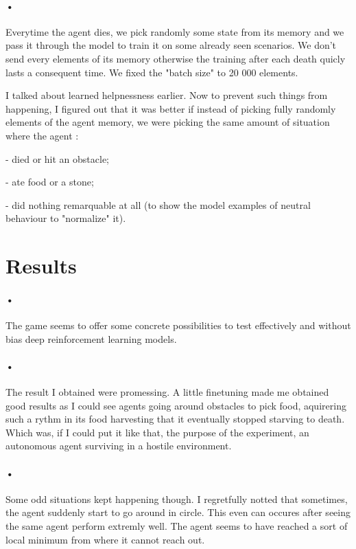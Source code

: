 \documentclass{article}
\begin{document}
\paragraph{•}
Everytime the agent dies, we pick randomly some state from its memory and we pass it through the model to train it on some already seen scenarios. We don't send every elements of its memory otherwise the training after each death quicly lasts a consequent time. We fixed the "batch size" to 20 000 elements.\par
I talked about learned helpnessness\cite{wiki:learned_helplessness} earlier. Now to prevent such things from happening, I figured out that it was better if instead of picking fully randomly elements of the agent memory, we were picking the same amount of situation where the agent :\par
- died or hit an obstacle;\par
- ate food or a stone;\par
- did nothing remarquable at all (to show the model examples of neutral behaviour to "normalize" it).\par

\section{Results}

\paragraph{•}
The game seems to offer some concrete possibilities to test effectively and without bias deep reinforcement learning models.

\paragraph{•}
The result I obtained were promessing. A little finetuning made me obtained good results as I could see agents going around obstacles to pick food, aquirering such a rythm in its food harvesting that it eventually stopped starving to death. Which was, if I could put it like that, the purpose of the experiment, an autonomous agent surviving in a hostile environment.

\paragraph{•}
Some odd situations kept happening though. I regretfully notted that sometimes, the agent suddenly start to go around in circle. This even can occures after seeing the same agent perform extremly well. The agent seems to have reached a sort of local minimum from where it cannot reach out.
\end{document}
